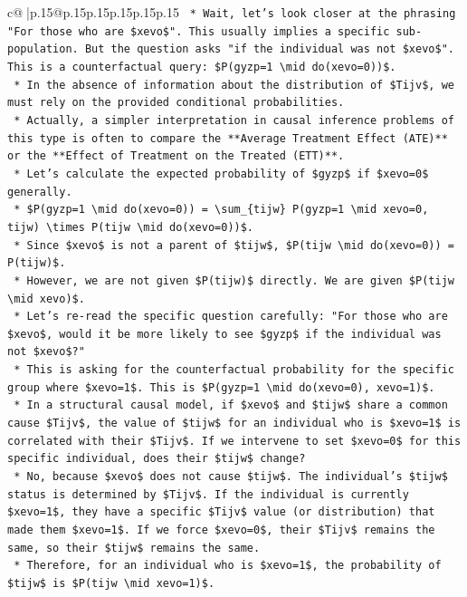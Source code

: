 \documentclass{article}
\begin{document}
{\begin{supertabular}{c@{$\;$}|p{.15\linewidth}@{}p{.15\linewidth}p{.15\linewidth}p{.15\linewidth}p{.15\linewidth}p{.15\linewidth}}
{{{\texttt{    *   Wait, let's look closer at the phrasing "For those who are \$xevo\$". This usually implies a specific sub{-}population. But the question asks "if the individual was not \$xevo\$". This is a counterfactual query: \$P(gyzp=1 \textbackslash{}mid do(xevo=0))\$.} \\
\texttt{    *   In the absence of information about the distribution of \$Tijv\$, we must rely on the provided conditional probabilities.} \\
\texttt{    *   Actually, a simpler interpretation in causal inference problems of this type is often to compare the **Average Treatment Effect (ATE)** or the **Effect of Treatment on the Treated (ETT)**.} \\
\texttt{    *   Let's calculate the expected probability of \$gyzp\$ if \$xevo=0\$ generally.} \\
\texttt{    *   \$P(gyzp=1 \textbackslash{}mid do(xevo=0)) = \textbackslash{}sum\_\{tijw\} P(gyzp=1 \textbackslash{}mid xevo=0, tijw) \textbackslash{}times P(tijw \textbackslash{}mid do(xevo=0))\$.} \\
\texttt{    *   Since \$xevo\$ is not a parent of \$tijw\$, \$P(tijw \textbackslash{}mid do(xevo=0)) = P(tijw)\$.} \\
\texttt{    *   However, we are not given \$P(tijw)\$ directly. We are given \$P(tijw \textbackslash{}mid xevo)\$.} \\
\texttt{    *   Let's re{-}read the specific question carefully: "For those who are \$xevo\$, would it be more likely to see \$gyzp\$ if the individual was not \$xevo\$?"} \\
\texttt{    *   This is asking for the counterfactual probability for the specific group where \$xevo=1\$. This is \$P(gyzp=1 \textbackslash{}mid do(xevo=0), xevo=1)\$.} \\
\texttt{    *   In a structural causal model, if \$xevo\$ and \$tijw\$ share a common cause \$Tijv\$, the value of \$tijw\$ for an individual who is \$xevo=1\$ is correlated with their \$Tijv\$. If we intervene to set \$xevo=0\$ for this specific individual, does their \$tijw\$ change?} \\
\texttt{    *   No, because \$xevo\$ does not cause \$tijw\$. The individual's \$tijw\$ status is determined by \$Tijv\$. If the individual is currently \$xevo=1\$, they have a specific \$Tijv\$ value (or distribution) that made them \$xevo=1\$. If we force \$xevo=0\$, their \$Tijv\$ remains the same, so their \$tijw\$ remains the same.} \\
\texttt{    *   Therefore, for an individual who is \$xevo=1\$, the probability of \$tijw\$ is \$P(tijw \textbackslash{}mid xevo=1)\$.} \\
}}}
\end{supertabular}}
\end{document}
